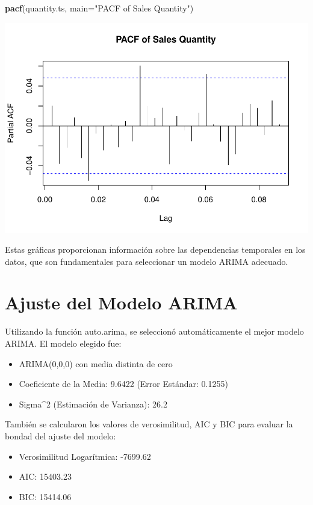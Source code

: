 \documentclass[
]{book}
\newenvironment{Shaded}{\begin{snugshade}}{\end{snugshade}}
\newcommand{\AttributeTok}[1]{\textcolor[rgb]{0.13,0.29,0.53}{#1}}
\newcommand{\FunctionTok}[1]{\textcolor[rgb]{0.13,0.29,0.53}{\textbf{#1}}}
\newcommand{\NormalTok}[1]{#1}
\newcommand{\StringTok}[1]{\textcolor[rgb]{0.31,0.60,0.02}{#1}}
\providecommand{\tightlist}{%
  \setlength{\itemsep}{0pt}\setlength{\parskip}{0pt}}
\begin{document}
\begin{Shaded}
\begin{Highlighting}[]
\FunctionTok{pacf}\NormalTok{(quantity.ts, }\AttributeTok{main=}\StringTok{"PACF of Sales Quantity"}\NormalTok{)}
\end{Highlighting}
\end{Shaded}

\includegraphics{_main_files/figure-latex/unnamed-chunk-36-2.pdf}

Estas gráficas proporcionan información sobre las dependencias temporales en los datos, que son fundamentales para seleccionar un modelo ARIMA adecuado.

\section{Ajuste del Modelo ARIMA}\label{ajuste-del-modelo-arima}

Utilizando la función auto.arima, se seleccionó automáticamente el mejor modelo ARIMA. El modelo elegido fue:

\begin{itemize}
\tightlist
\item
  ARIMA(0,0,0) con media distinta de cero
\item
  Coeficiente de la Media: 9.6422 (Error Estándar: 0.1255)
\item
  Sigma\^{}2 (Estimación de Varianza): 26.2
\end{itemize}

También se calcularon los valores de verosimilitud, AIC y BIC para evaluar la bondad del ajuste del modelo:

\begin{itemize}
\tightlist
\item
  Verosimilitud Logarítmica: -7699.62
\item
  AIC: 15403.23
\item
  BIC: 15414.06
\end{itemize}
\end{document}
